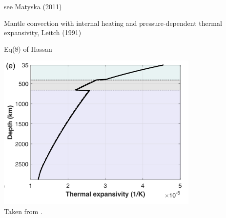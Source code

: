 see Matyska \etal (2011) \cite{mayw11}

Mantle convection with internal heating and pressure-dependent thermal expansivity, Leitch \etal (1991) \cite{leys91}

Eq(8) of Hassan \etal \cite{hafg15}

\begin{center}
\includegraphics[width=10cm]{images/thermal_expansion/nemi23}\\
{\captionfont Taken from \textcite{nemi23}.}
\end{center}
